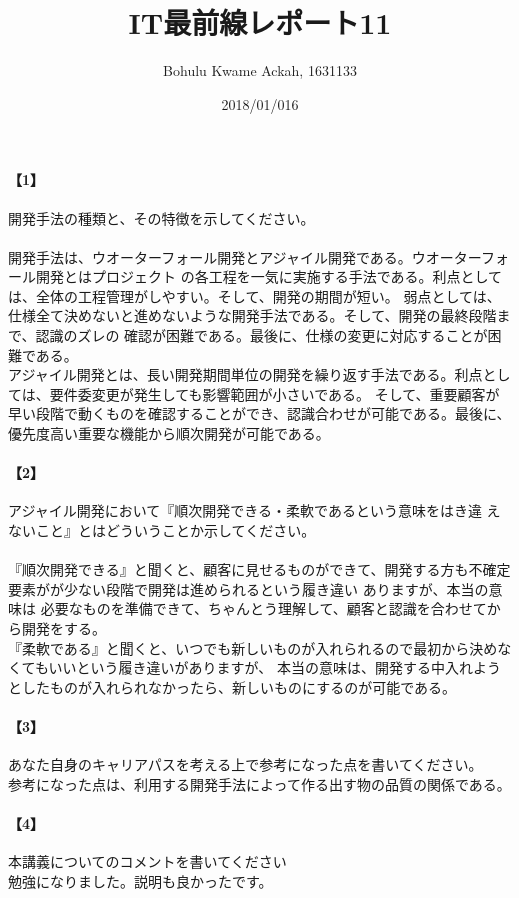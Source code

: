 \documentclass[20 pts]{article}
\title{IT最前線レポート11}
\author{Bohulu Kwame Ackah, 1631133}
\date{2018/01/016}
\begin{document}
\maketitle

\newpage
\paragraph{【1】}開発手法の種類と、その特徴を示してください。 \\
\paragraph{}
開発手法は、ウオーターフォール開発とアジャイル開発である。ウオーターフォール開発とはプロジェクト
の各工程を一気に実施する手法である。利点としては、全体の工程管理がしやすい。そして、開発の期間が短い。
弱点としては、仕様全て決めないと進めないような開発手法である。そして、開発の最終段階まで、認識のズレの
確認が困難である。最後に、仕様の変更に対応することが困難である。\\

アジャイル開発とは、長い開発期間単位の開発を繰り返す手法である。利点としては、要件委変更が発生しても影響範囲が小さいである。
そして、重要顧客が早い段階で動くものを確認することができ、認識合わせが可能である。最後に、優先度高い重要な機能から順次開発が可能である。

\paragraph{【2】}アジャイル開発において『順次開発できる・柔軟であるという意味をはき違
えないこと』とはどういうことか示してください。\\
\paragraph{}
『順次開発できる』と聞くと、顧客に見せるものができて、開発する方も不確定要素がが少ない段階で開発は進められるという履き違い
ありますが、本当の意味は
必要なものを準備できて、ちゃんとう理解して、顧客と認識を合わせてから開発をする。\\

『柔軟である』と聞くと、いつでも新しいものが入れられるので最初から決めなくてもいいという履き違いがありますが、
本当の意味は、開発する中入れようとしたものが入れられなかったら、新しいものにするのが可能である。


\newpage
\paragraph{【3】}あなた自身のキャリアパスを考える上で参考になった点を書いてください。\\
参考になった点は、利用する開発手法によって作る出す物の品質の関係である。



\paragraph{【4】}本講義についてのコメントを書いてください\\
勉強になりました。説明も良かったです。
\end{document}
